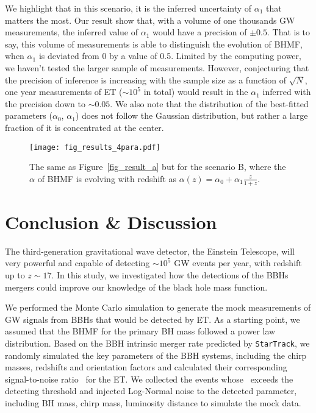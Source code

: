 \documentclass[twocolumn]{aastex62}
\begin{document}
We highlight that in this scenario, it is the inferred uncertainty of $\alpha_1$ that matters the most. Our result show that, with a volume of one thousands GW measurements, the inferred value of $\alpha_1$ would have a precision of $\pm0.5$. That is to say, this volume of measurements is able to distinguish the evolution of BHMF, when $\alpha_1$ is deviated from 0 by a value of 0.5. Limited by the computing power, we haven't tested the larger sample of measurements. However, conjecturing that the precision of inference is increasing with the sample size as a function of $\sqrt{N}$, one year measurements of ET ($\sim10^5$ in total) would result in the $\alpha_1$ inferred with the precision down to $\sim0.05$.
We also note that the distribution of the best-fitted parameters ($\alpha_0$, $\alpha_1$) does not follow the Gaussian distribution, but rather a large fraction of it is concentrated at the center. 

\begin{figure}%
\texttt{[image: fig\_results\_4para.pdf]}
\caption{
The same as Figure~\ref{fig_result_a} but for the scenario B, where the $\alpha$ of BHMF is evolving with redshift as $\alpha(z) = \alpha_0 + \alpha_1\frac{z}{1+z}$. 
}
\label{fig_result_b}
\end{figure}

\vspace{1cm}
\section{Conclusion \& Discussion} \label{sec_summary}
The third-generation gravitational wave detector, the Einstein Telescope, will very powerful and capable of detecting $\sim10^5$ GW events per year, with redshift up to $z\sim17$. In this study, we investigated how the detections of the BBHs mergers could improve our knowledge of the black hole mass function.

We performed the Monte Carlo simulation to generate the mock measurements of GW signals from BBHs that would be detected by ET. As a starting point, we assumed that the BHMF for the primary BH mass followed a power law distribution. Based on the BBH intrinsic merger rate predicted by {\tt StarTrack}, we randomly simulated the key parameters of the BBH systems, including the chirp masses, redshifts and orientation factors and calculated  their corresponding signal-to-noise ratio \snr\ for the ET. We collected the events whose \snr\ exceeds the detecting threshold and injected Log-Normal noise to the detected parameter, including BH mass, chirp mass, luminosity distance to simulate the mock data.
\end{document}
